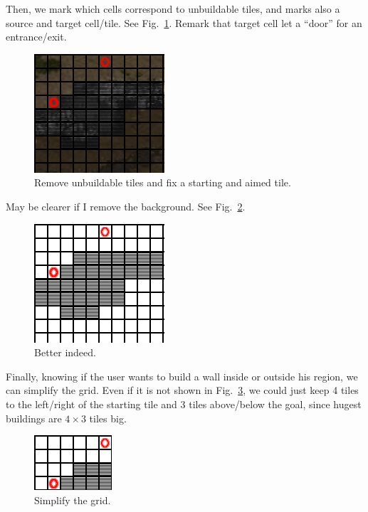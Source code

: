 \documentclass[a4paper,11pt]{article}
\begin{document}
Then, we mark  which cells correspond to unbuildable  tiles, and marks
also      a      source       and      target      cell/tile.      See
Fig.~\ref{figs:choke_grid_marked}.  Remark  that  target  cell  let  a
``door'' for an entrance/exit.

\begin{figure}[!h]
  \centering
  \includegraphics[width=.4\linewidth]{figs/choke_grid_marked}
  \caption{Remove unbuildable tiles and fix a starting and aimed tile.}
  \label{figs:choke_grid_marked}
\end{figure}

May be clearer if I remove the background. See Fig.~\ref{figs:grid}.

\begin{figure}[!h]
  \centering
  \includegraphics[width=.4\linewidth]{figs/grid}
  \caption{Better indeed.}
  \label{figs:grid}
\end{figure}


Finally, knowing if  the user wants to build a  wall inside or outside
his  region, we can  simplify the  grid. Even  if it  is not  shown in
Fig.~\ref{figs:grid_simplified}, we could just keep 4 tiles to the
left/right  of the  starting tile  and 3  tiles above/below  the goal,
since hugest buildings are $4 \times 3$ tiles big.

\begin{figure}[!h]
  \centering
  \includegraphics[width=.4\linewidth]{figs/grid_simplified}
  \caption{Simplify the grid.}
  \label{figs:grid_simplified}
\end{figure}
\end{document}
